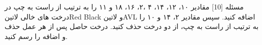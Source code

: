 ‌مسئله [10]
مقادیر ۱۰، ۱۲، ۱۴، ۴ ،‌۲، ۱۶، ۱۸ و ۱۱ را به ترتیب از راست به چپ در درخت های خالی ‌لاتین{Red Black} و ‌لاتین{AVL}
اضافه کنید. سپس مقادیر ۲، ۱۴ و ۱۰ را به ترتیب از راست به چپ، از دو درخت حذف کنید. درخت حاصل پس از هر عمل حذف و اضافه را رسم کنید.








%	
%
%
%		




